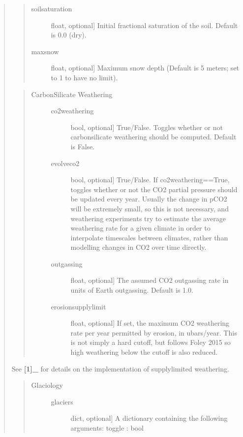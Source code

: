 \documentclass[letterpaper,10pt,english]{sphinxmanual}
\begin{document}
\begin{fulllineitems}
\begin{fulllineitems}
\begin{quote}
\begin{quote}
\begin{description}
\item[{soilsaturation}] \leavevmode{[}float, optional{]}
Initial fractional saturation of the soil. Default is 0.0 (dry).

\item[{maxsnow}] \leavevmode{[}float, optional{]}
Maximum snow depth (Default is 5 meters; set to \sphinxhyphen{}1 to have no limit).

\end{description}
\end{quote}

\begin{quote}
\begin{description}
\item[{Carbon\sphinxhyphen{}Silicate Weathering}] \leavevmode\begin{description}
\item[{co2weathering}] \leavevmode{[}bool, optional{]}
True/False. Toggles whether or not carbon\sphinxhyphen{}silicate weathering should be
computed. Default is False.

\item[{evolveco2}] \leavevmode{[}bool, optional{]}
True/False. If co2weathering==True, toggles whether or not the CO2 partial
pressure should be updated every year. Usually the change in pCO2 will be
extremely small, so this is not necessary, and weathering experiments try
to estimate the average weathering rate for a given climate in order to
interpolate timescales between climates, rather than modelling changes in CO2
over time directly.

\item[{outgassing}] \leavevmode{[}float, optional{]}
The assumed CO2 outgassing rate in units of Earth outgassing. Default is 1.0.

\item[{erosionsupplylimit}] \leavevmode{[}float, optional{]}
If set, the maximum CO2 weathering rate per year permitted by
erosion, in ubars/year. This is not simply a hard cutoff, but follows
Foley 2015 so high weathering below the cutoff is also reduced.

\end{description}

\end{description}
\end{quote}

See {\color{red}\bfseries{}{[}1{]}\_} for details on the implementation of supply\sphinxhyphen{}limited weathering.
\begin{quote}
\begin{description}
\item[{Glaciology}] \leavevmode\begin{description}
\item[{glaciers}] \leavevmode{[}dict, optional{]}
A dictionary containing the following arguments:
toggle : bool
\begin{quote}


\end{quote}
\end{description}
\end{description}
\end{quote}
\end{quote}
\end{fulllineitems}
\end{fulllineitems}
\end{document}
